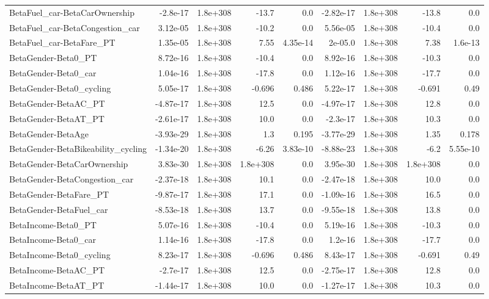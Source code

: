 \begin{tabular}{lrrrrrrrr}
BetaFuel_car-BetaCarOwnership & -2.8e-17 & 1.8e+308 & -13.7 & 0.0 & -2.82e-17 & 1.8e+308 & -13.8 & 0.0 \\
BetaFuel_car-BetaCongestion_car & 3.12e-05 & 1.8e+308 & -10.2 & 0.0 & 5.56e-05 & 1.8e+308 & -10.4 & 0.0 \\
BetaFuel_car-BetaFare_PT & 1.35e-05 & 1.8e+308 & 7.55 & 4.35e-14 & 2e-05.0 & 1.8e+308 & 7.38 & 1.6e-13 \\
BetaGender-Beta0_PT & 8.72e-16 & 1.8e+308 & -10.4 & 0.0 & 8.92e-16 & 1.8e+308 & -10.3 & 0.0 \\
BetaGender-Beta0_car & 1.04e-16 & 1.8e+308 & -17.8 & 0.0 & 1.12e-16 & 1.8e+308 & -17.7 & 0.0 \\
BetaGender-Beta0_cycling & 5.05e-17 & 1.8e+308 & -0.696 & 0.486 & 5.22e-17 & 1.8e+308 & -0.691 & 0.49 \\
BetaGender-BetaAC_PT & -4.87e-17 & 1.8e+308 & 12.5 & 0.0 & -4.97e-17 & 1.8e+308 & 12.8 & 0.0 \\
BetaGender-BetaAT_PT & -2.61e-17 & 1.8e+308 & 10.0 & 0.0 & -2.3e-17 & 1.8e+308 & 10.3 & 0.0 \\
BetaGender-BetaAge & -3.93e-29 & 1.8e+308 & 1.3 & 0.195 & -3.77e-29 & 1.8e+308 & 1.35 & 0.178 \\
BetaGender-BetaBikeability_cycling & -1.34e-20 & 1.8e+308 & -6.26 & 3.83e-10 & -8.88e-23 & 1.8e+308 & -6.2 & 5.55e-10 \\
BetaGender-BetaCarOwnership & 3.83e-30 & 1.8e+308 & 1.8e+308 & 0.0 & 3.95e-30 & 1.8e+308 & 1.8e+308 & 0.0 \\
BetaGender-BetaCongestion_car & -2.37e-18 & 1.8e+308 & 10.1 & 0.0 & -2.47e-18 & 1.8e+308 & 10.0 & 0.0 \\
BetaGender-BetaFare_PT & -9.87e-17 & 1.8e+308 & 17.1 & 0.0 & -1.09e-16 & 1.8e+308 & 16.5 & 0.0 \\
BetaGender-BetaFuel_car & -8.53e-18 & 1.8e+308 & 13.7 & 0.0 & -9.55e-18 & 1.8e+308 & 13.8 & 0.0 \\
BetaIncome-Beta0_PT & 5.07e-16 & 1.8e+308 & -10.4 & 0.0 & 5.19e-16 & 1.8e+308 & -10.3 & 0.0 \\
BetaIncome-Beta0_car & 1.14e-16 & 1.8e+308 & -17.8 & 0.0 & 1.2e-16 & 1.8e+308 & -17.7 & 0.0 \\
BetaIncome-Beta0_cycling & 8.23e-17 & 1.8e+308 & -0.696 & 0.486 & 8.43e-17 & 1.8e+308 & -0.691 & 0.49 \\
BetaIncome-BetaAC_PT & -2.7e-17 & 1.8e+308 & 12.5 & 0.0 & -2.75e-17 & 1.8e+308 & 12.8 & 0.0 \\
BetaIncome-BetaAT_PT & -1.44e-17 & 1.8e+308 & 10.0 & 0.0 & -1.27e-17 & 1.8e+308 & 10.3 & 0.0 \\

\end{tabular}
